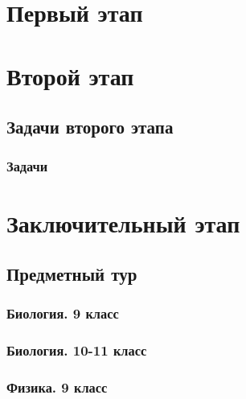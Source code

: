 \documentclass[a4paper,12pt,oneside]{book}
\begin{document}

\setcounter{tocdepth}{1}

\tableofcontents



\part{Первый этап}





\part{Второй этап}
\clearpage
\chapter{Задачи второго этапа}
\section{Задачи}


 
\part{Заключительный этап}

\clearpage
\chapter{Предметный тур}

\section{Биология. 9 класс}


\section{Биология. 10-11 класс}


\section{Физика. 9 класс}

\end{document}
